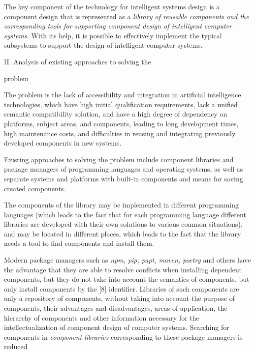 \documentclass{article}
\begin{document}
\begin{multicols}{2}
\begin{itemize}[noitemsep]
\end{itemize}
The key component of the technology for intelligent
systems design is a component design that is represented
as a \textit{library of reusable components and the corresponding tools for supporting component design of intelligent
computer systems.} With its help, it is possible to effectively implement the typical subsystems to support the
design of intelligent computer systems.
\begin{center}
    II. Analysis of existing approaches to solving the\par
problem

\end{center}
\hspace*{2em}The problem is the lack of accessibility and integration
in artificial intelligence technologies, which have high
initial qualification requirements, lack a unified semantic
compatibility solution, and have a high degree of dependency on platforms, subject areas, and components,
leading to long development times, high maintenance
costs, and difficulties in reusing and integrating previously developed components in new systems.\par
Existing approaches to solving the problem include
component libraries and package managers of programming languages and operating systems, as well as separate systems and platforms with built-in components and
means for saving created components.\par
The components of the library may be implemented in
different programming languages (which leads to the fact
that for each programming language different libraries
are developed with their own solutions to various common situations), and may be located in different places,
which leads to the fact that the library needs a tool to
find components and install them.\par
Modern package managers such as \textit{npm, pip, papt,
maven, poetry} and others have the advantage that they
are able to resolve conflicts when installing dependent
components, but they do not take into account the
semantics of components, but only install components
by the [8] identifier. Libraries of such components are
only a repository of components, without taking into
account the purpose of components, their advantages
and disadvantages, areas of application, the hierarchy
of components and other information necessary for the
intellectualization of component design of computer systems. Searching for components in \textit{component libraries}
corresponding to these package managers is reduced

\end{multicols}
\end{document}

